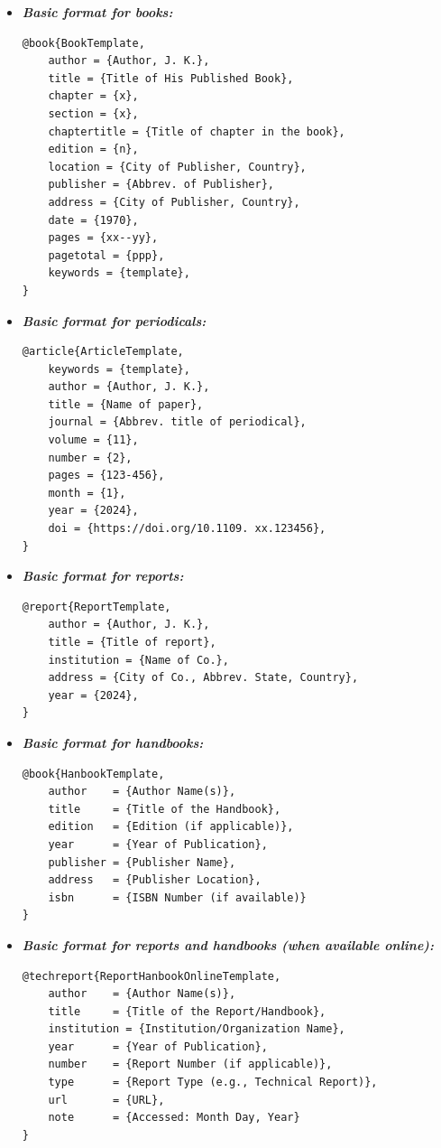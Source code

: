 \begin{itemize}

  \item \textit{\textbf{Basic format for books:}} \cite{BookTemplate}
  \begin{lstlisting}[language=TeX]
@book{BookTemplate,
    author = {Author, J. K.},
    title = {Title of His Published Book},
    chapter = {x},
    section = {x},
    chaptertitle = {Title of chapter in the book},
    edition = {n},
    location = {City of Publisher, Country},
    publisher = {Abbrev. of Publisher},
    address = {City of Publisher, Country},
    date = {1970},
    pages = {xx--yy},
    pagetotal = {ppp},
    keywords = {template},
}
  \end{lstlisting}

  \item \textit{\textbf{Basic format for periodicals:}} \cite{ArticleTemplate}
  \begin{lstlisting}[language=TeX]
@article{ArticleTemplate,
    keywords = {template},
    author = {Author, J. K.},
    title = {Name of paper},
    journal = {Abbrev. title of periodical},
    volume = {11},
    number = {2},
    pages = {123-456},
    month = {1},
    year = {2024},
    doi = {https://doi.org/10.1109. xx.123456},
}
  \end{lstlisting}

  \item \textit{\textbf{Basic format for reports:}} \cite{ReportTemplate}
  \begin{lstlisting}[language=TeX]
@report{ReportTemplate,
    author = {Author, J. K.},
    title = {Title of report},
    institution = {Name of Co.},
    address = {City of Co., Abbrev. State, Country},
    year = {2024},
}
  \end{lstlisting}

\newpage
  \item \textit{\textbf{Basic format for handbooks:}} \cite{HanbookTemplate}
  \begin{lstlisting}[language=TeX]
@book{HanbookTemplate,
    author    = {Author Name(s)},
    title     = {Title of the Handbook},
    edition   = {Edition (if applicable)},
    year      = {Year of Publication},
    publisher = {Publisher Name},
    address   = {Publisher Location},
    isbn      = {ISBN Number (if available)}
}
  \end{lstlisting}

  \item \textit{\textbf{Basic format for reports and handbooks (when available online):}} \cite{ReportHanbookOnlineTemplate}
  \begin{lstlisting}[language=TeX]
@techreport{ReportHanbookOnlineTemplate,
    author    = {Author Name(s)},
    title     = {Title of the Report/Handbook},
    institution = {Institution/Organization Name},
    year      = {Year of Publication},
    number    = {Report Number (if applicable)},
    type      = {Report Type (e.g., Technical Report)},
    url       = {URL},
    note      = {Accessed: Month Day, Year}
}
  \end{lstlisting}


\end{itemize}
